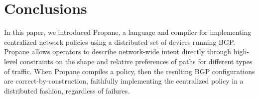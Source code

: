 \documentclass[10pt]{sigalternate052015}
\newcommand{\sysname}{{\small \sf Propane}\xspace}
\begin{document}
%
%
%
%

\section{Conclusions}
\label{sec:conclusions}

In this paper, we introduced \sysname, a language and compiler for implementing centralized network policies using a distributed set of devices running BGP. Propane allows operators to describe network-wide intent directly through high-level constraints on the shape and relative preferences of paths for different types of traffic. When \sysname compiles a policy, then the resulting BGP configurations are correct-by-construction, faithfully implementing the centralized policy in a distributed fashion, regardless of failures.



%
%
%
%
\end{document}
